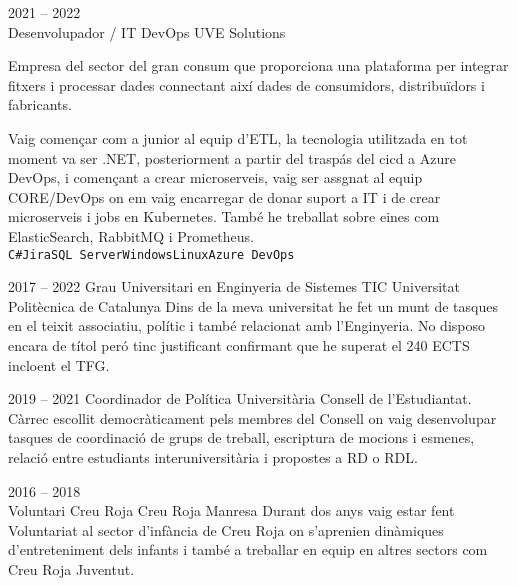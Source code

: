 \documentclass[9pt]{developercv} %
\begin{document}
\begin{entrylist}
	\entry
	{2021 -- 2022\\}
	{Desenvolupador / IT DevOps}
	{UVE Solutions}
	{Empresa del sector del gran consum que proporciona una plataforma per integrar fitxers i
		processar dades connectant així dades de consumidors, distribuïdors i fabricants.

		Vaig començar com a junior al equip d’ETL, la tecnologia utilitzada en tot moment va ser .NET, posteriorment a partir del traspás del cicd a Azure DevOps, i començant a crear microserveis, vaig ser
		assgnat al equip CORE/DevOps on em vaig encarregar de donar suport a IT i de crear microserveis
		i jobs en Kubernetes.
		També he treballat sobre eines com ElasticSearch, RabbitMQ i Prometheus.
		\\ \texttt{C\#}\slashsep\texttt{Jira}\slashsep\texttt{SQL Server}\slashsep\texttt{Windows}\slashsep\texttt{Linux}\slashsep\texttt{Azure DevOps}}
\end{entrylist}
\clearpage


\begin{entrylist}
	\entry
	{2017 -- 2022}
	{Grau Universitari en Enginyeria de Sistemes TIC}
	{Universitat Politècnica de Catalunya}
	{Dins de la meva universitat he fet un munt de tasques en el teixit associatiu, polític i també
		relacionat amb l’Enginyeria. No disposo encara de títol peró tinc justificant confirmant que he superat el 240 ECTS incloent el TFG.}
\end{entrylist}


\begin{entrylist}
	\entry
	{2019 -- 2021}
	{Coordinador de Política Universitària}
	{Consell de l'Estudiantat.}
	{ Càrrec escollit democràticament pels membres del Consell on vaig desenvolupar tasques de
		coordinació de grups de treball, escriptura de mocions i esmenes, relació entre estudiants
		interuniversitària i propostes a RD o RDL.
		\\ }

	\entry
	{2016 -- 2018\\}
	{Voluntari Creu Roja}
	{Creu Roja Manresa}
	{Durant dos anys vaig estar fent Voluntariat al sector d’infància de Creu Roja on s’aprenien
		dinàmiques d’entreteniment dels infants i també a treballar en equip en altres sectors com Creu
		Roja Juventut. \\ }
\end{entrylist}
\end{document}
